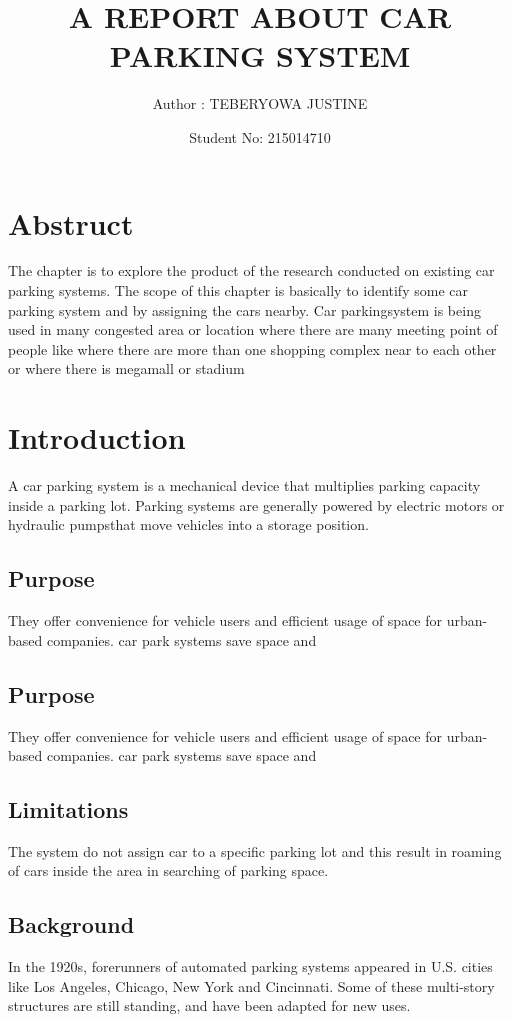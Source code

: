 \documentclass{article}
\begin{document}
		\title{A REPORT ABOUT CAR PARKING SYSTEM}
		\author{Author :  TEBERYOWA  JUSTINE }
		\date{Student No: 215014710}
		\maketitle
	

	\tableofcontents

	\section{Abstruct}
The chapter is to explore the product of the research conducted on existing car parking systems. The scope of this chapter is basically to identify some car parking system and by assigning the cars nearby.
Car parkingsystem is being used in many congested area or location where there are many meeting point of people like where there are more than one shopping complex near to each other or where there is megamall or stadium

\section{Introduction}
      A car parking system is a mechanical device that multiplies parking capacity inside a parking lot. Parking systems are generally powered by electric motors or hydraulic pumpsthat move vehicles into a storage position.

\subsection{Purpose}
     They offer convenience for vehicle users and efficient usage of space for urban-based companies. car park systems save space and 

\subsection{Purpose}
     They offer convenience for vehicle users and efficient usage of space for urban-based companies. car park systems save space and 

\subsection{Limitations}
The  system do not assign car to a specific parking lot and this result in roaming of cars inside the area in searching of parking space.

\subsection{Background}
In the 1920s, forerunners of automated parking systems appeared in U.S. cities like Los Angeles, Chicago, New York and Cincinnati. Some of these multi-story structures are still standing, and have been adapted for new uses.
\end{document}
